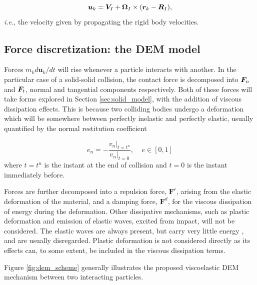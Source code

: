 %
\begin{equation} \label{eq:rigid_propag_vel}
	\boldsymbol{u}_k= \boldsymbol{V}_I+\boldsymbol{\Omega}_I \times (\boldsymbol{r}_k-\boldsymbol{R}_I),
\end{equation}
%
\textit{i.e.}, the velocity given by propagating the rigid body velocities.


\subsection{Force discretization: the DEM model}
\label{sec:solid-discretization_force}

Forces $m_k {{d{\boldsymbol{u}_k}}}/{{dt}}$ will rise whenever a particle interacts with another. In the particular case of a solid-solid collision, the contact force is decomposed into $\boldsymbol{F}_n$ and $\boldsymbol{F}_t$, normal and tangential components respectively. Both of these forces will take forms explored in Section \ref{sec:solid_model}, with the addition of viscous dissipation effects. This is because two colliding bodies undergo a deformation which will be somewhere between perfectly inelastic and perfectly elastic, usually quantified by the normal restitution coefficient

%
\begin{equation} \label{eq:rest_coeff_def}
	e_n=-\frac{v_n|_{t=t^n}}{v_n|_{t=0}}, \;\;\;\; e\in[0,1]
\end{equation}
%
where $t=t^n$ is the instant at the end of collision and $t=0$ is the instant immediately before.

Forces are further decomposed into a repulsion force, $\boldsymbol{F}^r$, arising from the elastic deformation of the material, and a damping force, $\boldsymbol{F}^d$, for the viscous dissipation of energy during the deformation. Other dissipative mechanisms, such as plastic deformation and emission of elastic waves, excited from impact, will not be considered. The elastic waves are always present, but carry very little energy \citep{Shaefer-1996}, and are usually disregarded. Plastic deformation is not considered directly as its effects can, to some extent, be included in the viscous dissipation terms.

Figure \ref{fig:dem_scheme} generally illustrates the proposed viscoelastic DEM mechanism between two interacting particles.

